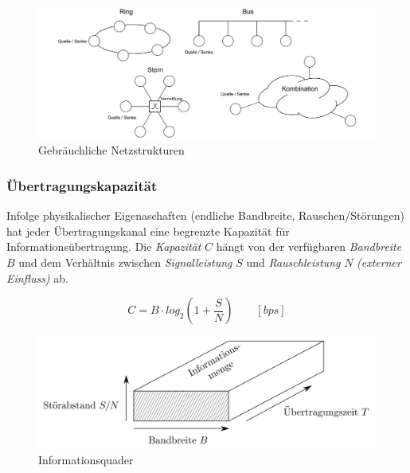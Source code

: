 \documentclass[
  10pt,
  a4paper,
  german]{article}
\numberwithin{equation}{section}
\begin{document}
\begin{figure}[H]

{\centering \includegraphics{images/01_Netzstruktur.png}

}

\caption{Gebräuchliche Netzstrukturen}

\end{figure}

\hypertarget{uxfcbertragungskapazituxe4t}{%
\subsubsection{Übertragungskapazität}\label{uxfcbertragungskapazituxe4t}}

Infolge physikalischer Eigenaschaften (endliche Bandbreite,
Rauschen/Störungen) hat jeder Übertragungskanal eine begrenzte Kapazität
für Informationsübertragung. Die \emph{Kapazität} \(C\) hängt von der
verfügbaren \emph{Bandbreite} \(B\) und dem Verhältnis zwischen
\emph{Signalleistung} \(S\) und \emph{Rauschleistung} \(N\)
\emph{(externer Einfluss)} ab.

\[
C = B\cdot log_2\left(1+\frac{S}{N}\right)\qquad [bps]
\]

\begin{figure}[H]

{\centering \includegraphics{images/01_Informationsquader.png}

}

\caption{Informationsquader}

\end{figure}
\end{document}
